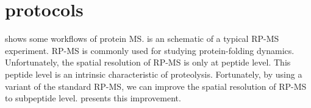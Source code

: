 \section{\texorpdfstring{}{MS} protocols}
\label{sec:fund2:MS-protocols}

 shows some workflows of protein \gls{MS}.
 is an schematic of a typical \gls{RP-MS} experiment.
\Gls{RP-MS} is commonly used for studying protein-folding dynamics.
Unfortunately, the spatial resolution of \gls{RP-MS} is only at peptide level. 
This peptide level is an intrinsic characteristic of proteolysis.
Fortunately, by using a variant of the standard \gls{RP-MS}, we can improve the spatial resolution of \gls{RP-MS} to subpeptide level.
 presents this improvement.

